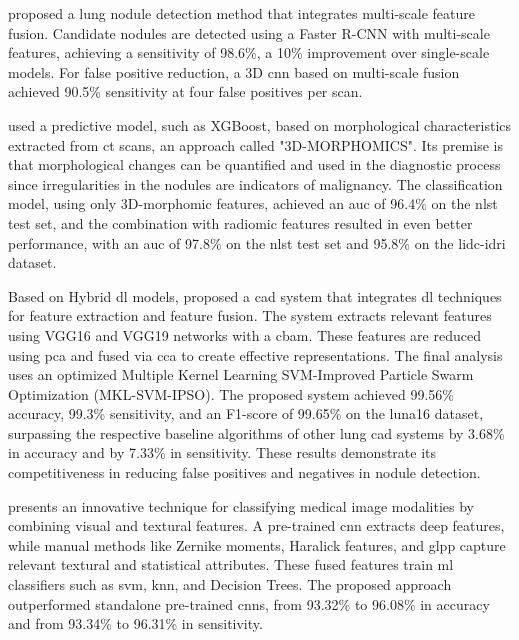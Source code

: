 \textcite{zhao_pulmonary_2022} proposed a lung nodule detection method that integrates multi-scale feature fusion. Candidate nodules are detected using a Faster R-CNN with multi-scale features, achieving a sensitivity of 98.6\%, a 10\% improvement over single-scale models. For false positive reduction, a 3D \ac{cnn} based on multi-scale fusion achieved 90.5\% sensitivity at four false positives per scan.

\textcite{munoz_3d-morphomics_2022} used a predictive model, such as XGBoost, based on morphological characteristics extracted from \ac{ct} scans, an approach called "3D-MORPHOMICS". Its premise is that morphological changes can be quantified and used in the diagnostic process since irregularities in the nodules are indicators of malignancy. The classification model, using only 3D-morphomic features, achieved an \ac{auc} of 96.4\% on the \ac{nlst} test set, and the combination with radiomic features resulted in even better performance, with an \ac{auc} of 97.8\% on the \ac{nlst} test set and 95.8\% on the \ac{lidc-idri} dataset.

Based on Hybrid \ac{dl} models, \textcite{li_research_2022} proposed a \ac{cad} system that integrates \ac{dl} techniques for feature extraction and feature fusion. The system extracts relevant features using VGG16 and VGG19 networks with a \ac{cbam}. These features are reduced using \ac{pca} and fused via \ac{cca} to create effective representations. The final analysis uses an optimized Multiple Kernel Learning SVM-Improved Particle Swarm Optimization (MKL-SVM-IPSO). The proposed system achieved 99.56\% accuracy, 99.3\% sensitivity, and an F1-score of 99.65\% on the \ac{luna16} dataset, surpassing the respective baseline algorithms of other lung \ac{cad} systems by 3.68\% in accuracy and by 7.33\% in sensitivity. These results demonstrate its competitiveness in reducing false positives and negatives in nodule detection.

\textcite{iqbal_fusion_2023} presents an innovative technique for classifying medical image modalities by combining visual and textural features. A pre-trained \ac{cnn} extracts deep features, while manual methods like Zernike moments, Haralick features, and \ac{glpp} capture relevant textural and statistical attributes. These fused features train \ac{ml} classifiers such as \ac{svm}, \ac{knn}, and Decision Trees. The proposed approach outperformed standalone pre-trained \acp{cnn}, from 93.32\% to 96.08\% in accuracy and from 93.34\% to 96.31\% in sensitivity.


